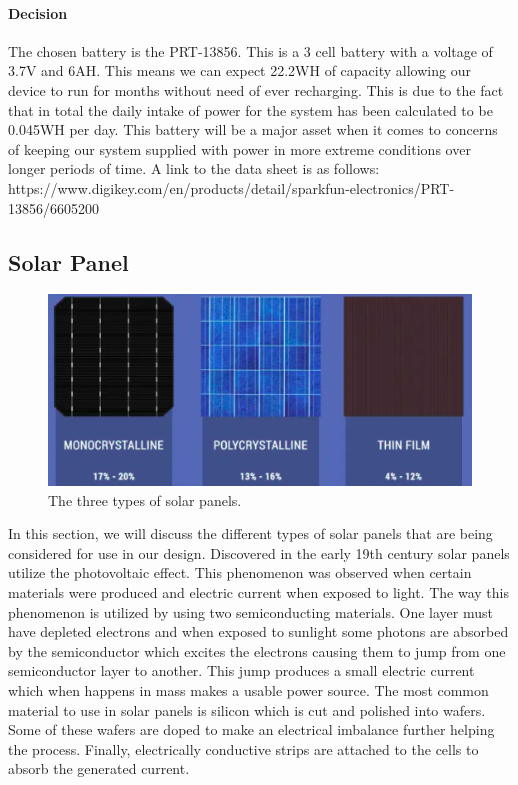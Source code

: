 \paragraph{Decision}
The chosen battery is the PRT-13856. This is a 3 cell battery with a voltage of 3.7V and 6AH. This means we can expect 22.2WH of capacity allowing our device to run for months without need of ever recharging. This is due to the fact that in total the daily intake of power for the system has been calculated to be 0.045WH per day. This battery will be a major asset when it comes to concerns of keeping our system supplied with power in more extreme conditions over longer periods of time. A link to the data sheet is as follows:
https://www.digikey.com/en/products/detail/sparkfun-electronics/PRT-13856/6605200

\subsection{Solar Panel}

\begin{figure}
    \centering
    \includegraphics[scale=0.4]{figures/solar panel overview.png}
    \caption{The three types of solar panels.}
    \label{solar-panel-overview} 
\end{figure}

In this section, we will discuss the different types of solar panels that are being considered for use in our design. Discovered in the early 19th century solar panels utilize the photovoltaic effect. This phenomenon was observed when certain materials were produced and electric current when exposed to light. The way this phenomenon is utilized by using two semiconducting materials. One layer must have depleted electrons and when exposed to sunlight some photons are absorbed by the semiconductor which excites the electrons causing them to jump from one semiconductor layer to another. This jump produces a small electric current which when happens in mass makes a usable power source. The most common material to use in solar panels is silicon which is cut and polished into wafers. Some of these wafers are doped to make an electrical imbalance further helping the process. Finally, electrically conductive strips are attached to the cells to absorb the generated current. 

